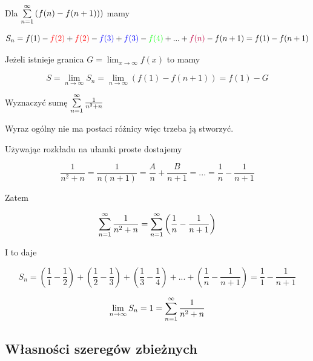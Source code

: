 \begin{przyklad}
Dla $ \sum\limits_{n = 1}^{\infty} \left( f(n) - f(n + 1)) \right) $ mamy

$$ S_n = f(1) - \textcolor{red}{f(2)} + \textcolor{red}{f(2)} - \textcolor{blue}{f(3)} + \textcolor{blue}{f(3)} - 
\textcolor{green}{f(4)} + ... + \textcolor{purple}{f(n)} - f(n + 1) = f(1) - f(n + 1) $$

Jeżeli istnieje granica $ G = \lim_{x \to \infty} f(x) $ to mamy

$$ S = \lim_{n \to \infty} S_n = \lim_{n \to \infty} \left( f(1) - f(n + 1) \right) = f(1) - G $$
\end{przyklad}

\begin{przyklad}

Wyznaczyć sumę $ \sum\limits_{n = 1}^{\infty} \frac{1}{n^2 + n} $

Wyraz ogólny nie ma postaci różnicy więc trzeba ją stworzyć.

Używając rozkładu na ułamki proste dostajemy

$$ \frac{1}{n^2 + n} = \frac{1}{n(n+1)} = \frac{A}{n} + \frac{B}{n+1} = ... = \frac{1}{n} - \frac{1}{n+1} $$

Zatem 

$$ \sum\limits_{n = 1}^{\infty} \frac{1}{n^2 + n} = \sum\limits_{n=1}^{\infty} \left( \frac{1}{n} - \frac{1}{n+1} \right) $$

I to daje

$$ S_n = \left( \frac{1}{1} - \frac{1}{2} \right) + \left( \frac{1}{2} - \frac{1}{3} \right) + \left( \frac{1}{3} - \frac{1}{4} \right)
+ ... + \left( \frac{1}{n} - \frac{1}{n+1} \right) = \frac{1}{1} - \frac{1}{n+1}  $$ 

$$ \lim_{n \to \infty} S_n = 1 = \sum\limits_{n = 1}^{\infty} \frac{1}{n^2 + n} $$
\end{przyklad}

\subsection*{Własności szeregów zbieżnych}

